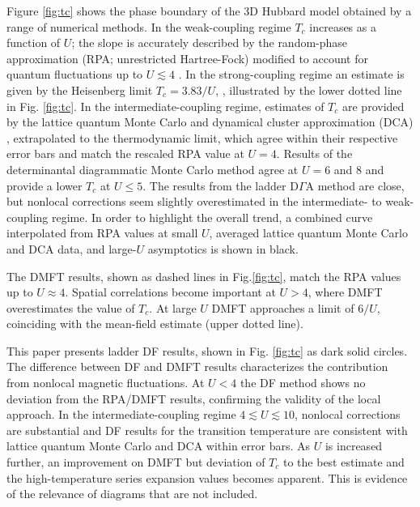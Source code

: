 \documentclass[aps,prb,twocolumn,amsmath,notitlepage,floatfix,footinbib,superscriptaddress,showpacs, showkeys]{revtex4-1}
\begin{document}
Figure \ref{fig:tc} shows the phase boundary of the 3D Hubbard model obtained by a range of numerical methods. 
In the weak-coupling regime $T_c$ increases as a function of $U$; the slope is accurately described by the random-phase approximation (RPA; unrestricted Hartree-Fock) \cite{Hirsch1987} modified to account for quantum fluctuations up to $U \lesssim 4$ \cite{Freericks1994,MR1992}. 
In the strong-coupling regime an estimate is given by the Heisenberg limit $T_c = 3.83/U$, \cite{Sandvik1998, Affleck1988}, illustrated by the lower dotted line in Fig. \ref{fig:tc}. 
In the intermediate-coupling regime, estimates of $T_c$ are provided by the lattice quantum Monte Carlo \cite{Staudt2000} and dynamical cluster approximation (DCA) \cite{Kent2005}, extrapolated to the thermodynamic limit, which agree within their respective error bars and match the rescaled RPA value at $U=4$. 
Results of the determinantal diagrammatic Monte Carlo method \cite{Kozik2013} agree at $U=6$ and $8$ and provide a lower $T_c$ at $U\leq 5$. 
The results from the ladder D$\Gamma$A method \cite{Rohringer2011} are close, but nonlocal corrections seem slightly overestimated in the intermediate- to weak-coupling regime. 
In order to highlight the overall trend, a combined curve interpolated from RPA values at small $U$, averaged lattice quantum Monte Carlo \cite{Staudt2000} and DCA\cite{Maier2005} data, and large-$U$ asymptotics is shown in black.

The DMFT results, shown as dashed lines in Fig.\ref{fig:tc}, match the RPA values up to $U \approx 4$. 
Spatial correlations become important at $U > 4$, where DMFT overestimates the value of $T_c$.
At large $U$ DMFT approaches a limit of $6/U$, coinciding with the mean-field estimate \cite{Takahashi1977} (upper dotted line). 

This paper presents ladder DF results, shown in Fig. \ref{fig:tc} as dark solid circles. 
The difference between DF and DMFT results characterizes the contribution from nonlocal magnetic fluctuations. 
At $U < 4$ the DF method shows no deviation from the RPA/DMFT results, confirming the validity of the local approach.
In the intermediate-coupling regime $4 \lesssim U \lesssim 10$, nonlocal corrections are substantial and DF results for the transition temperature are consistent with lattice quantum Monte Carlo and DCA within error bars. 
As $U$ is increased further, an improvement on DMFT but deviation of $T_c$ to the best estimate and the high-temperature series expansion values becomes apparent. 
This is evidence of the relevance of diagrams that are not included.
\end{document}
